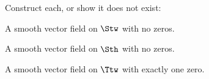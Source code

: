 Construct each, or show it does not exist:
\begin{alist}
\item A smooth vector field on $\Stw$ with no zeros.
\item A smooth vector field on $\Sth$ with no zeros.
\item A smooth vector field on $\Ttw$ with exactly one zero.
\end{alist}



